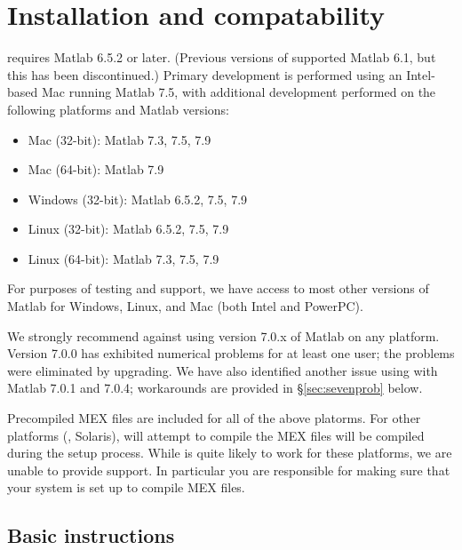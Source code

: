 \documentclass[12pt]{article}
\begin{document}
\newpage
\appendix

\section{Installation and compatability}
\label{s-installing}

\cvx requires Matlab 6.5.2 or later. (Previous
versions of \cvx supported Matlab 6.1, but this has been 
discontinued.) Primary \cvx development is performed using
an Intel-based Mac running Matlab 7.5, with additional
development performed on the following platforms and Matlab versions:
\begin{itemize}
\item Mac (32-bit): Matlab 7.3, 7.5, 7.9
\item Mac (64-bit): Matlab 7.9
\item Windows (32-bit): Matlab 6.5.2, 7.5, 7.9
\item Linux (32-bit): Matlab 6.5.2, 7.5, 7.9
\item Linux (64-bit): Matlab 7.3, 7.5, 7.9
\end{itemize}
For purposes of testing and support, we have access to most
other versions of Matlab for Windows, Linux, and Mac (both
Intel and PowerPC). 

We strongly recommend against using version 7.0.x of Matlab
on any platform. Version 7.0.0 has exhibited numerical problems for at least one user;
the problems were eliminated by upgrading.
We have also identified another issue using \cvx
with Matlab 7.0.1 and 7.0.4; workarounds
are provided in \S\ref{sec:sevenprob} below.

Precompiled MEX files are included for all of the above platorms.
For other platforms (\eg, Solaris), \cvx will attempt to compile 
the MEX files will be compiled during the setup
process. While \cvx is quite likely to work for
these platforms, we are unable to provide support. In particular
you are responsible for making sure that your system is
set up to compile MEX files.

\subsection{Basic instructions}
\label{sec:winlin}
\end{document}
